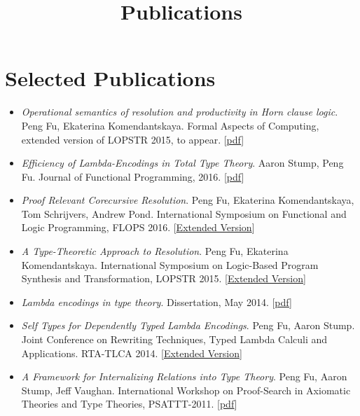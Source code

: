 \documentclass[10pt]{article}
\title{\bfseries\Large Publications}
\date{}
\begin{document}
\maketitle
\vspace{-4em}

\vspace{20pt}





\section*{Selected Publications}

\begin{itemize}
\item \textit{Operational semantics of resolution and productivity in Horn clause logic}. Peng Fu, Ekaterina Komendantskaya. Formal Aspects of Computing, extended version of LOPSTR 2015, to appear.
  [\href{../../document/papers/fac-journal.pdf}{pdf}]
  
\item \textit{Efficiency of Lambda-Encodings in Total Type Theory}. Aaron Stump, Peng Fu. Journal of Functional Programming, 2016.
  [\href{../../document/papers/efficiency.pdf}{pdf}]
  
\item \textit{Proof Relevant Corecursive Resolution}. Peng Fu, Ekaterina Komendantskaya, Tom Schrijvers, Andrew Pond. International Symposium on Functional and Logic Programming, FLOPS 2016. 
  [\href{../../document/papers/corec.pdf}{Extended Version}]
\item \textit{A Type-Theoretic Approach to Resolution}. Peng Fu, Ekaterina Komendantskaya. International Symposium on Logic-Based Program Synthesis and Transformation, LOPSTR 2015. [\href{../../document/papers/tm-lp.pdf}{Extended Version}]

\item \textit{Lambda encodings in type theory}. Dissertation, May 2014. [\href{../../document/papers/dissertation.pdf}{pdf}]

\item \textit{Self Types for Dependently Typed Lambda Encodings}. Peng Fu, Aaron Stump. Joint Conference on Rewriting Techniques, Typed Lambda Calculi and Applications. RTA-TLCA 2014. [\href{../../document/papers/rta-tlca.pdf}{Extended Version}]

\item \textit{A Framework for Internalizing Relations into Type Theory}. Peng Fu, Aaron Stump, Jeff Vaughan. International Workshop on Proof-Search in Axiomatic Theories and Type Theories, PSATTT-2011. [\href{../../document/papers/psattt-paper.pdf}{pdf}]
  
\end{itemize}
\end{document}
